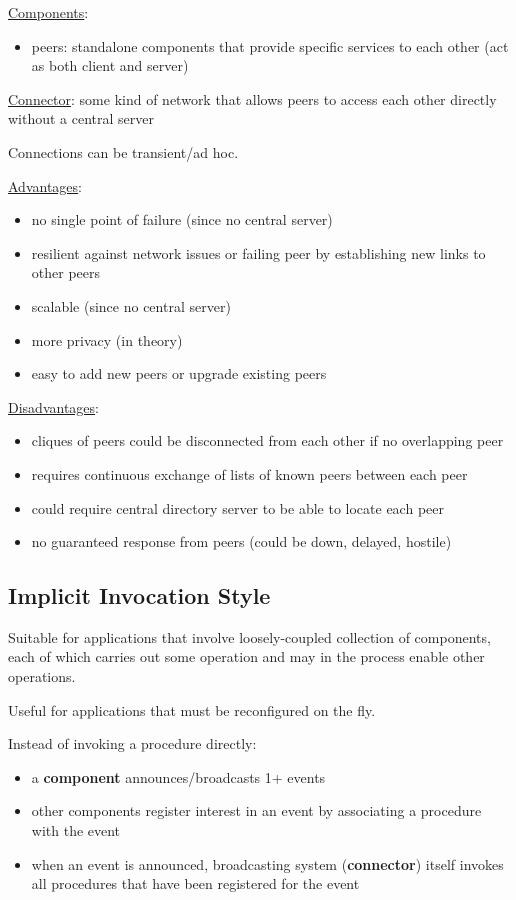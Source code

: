 \documentclass[11pt]{article}
\begin{document}
\uline{Components}:
\begin{itemize}
\item peers: standalone components that provide specific services to each
other (act as both client and server)
\end{itemize}

\uline{Connector}: some kind of network that allows peers to access each other
directly without a central server

Connections can be transient/ad hoc.

\uline{Advantages}:
\begin{itemize}
\item no single point of failure (since no central server)
\item resilient against network issues or failing peer by establishing
new links to other peers
\item scalable (since no central server)
\item more privacy (in theory)
\item easy to add new peers or upgrade existing peers
\end{itemize}

\uline{Disadvantages}:
\begin{itemize}
\item cliques of peers could be disconnected from each other if no overlapping
peer
\item requires continuous exchange of lists of known peers between each peer
\item could require central directory server to be able to locate each peer
\item no guaranteed response from peers (could be down, delayed, hostile)
\end{itemize}
\subsection{Implicit Invocation Style}
\label{sec:org472522a}
Suitable for applications that involve loosely-coupled collection of
components, each of which carries out some operation and may in the
process enable other operations.

Useful for applications that must be reconfigured on the fly.

Instead of invoking a procedure directly:
\begin{itemize}
\item a \textbf{component} announces/broadcasts 1+ events
\item other components register interest in an event by associating a
procedure with the event
\item when an event is announced, broadcasting system (\textbf{connector})
itself invokes all procedures that have been registered for the
event
\end{itemize}
\end{document}
